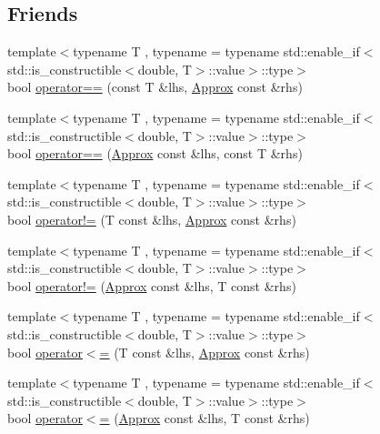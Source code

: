 \subsection*{Friends}
\begin{DoxyCompactItemize}
\item 
{\footnotesize template$<$typename T , typename  = typename std\-::enable\-\_\-if$<$std\-::is\-\_\-constructible$<$double, T$>$\-::value$>$\-::type$>$ }\\bool \hyperlink{class_catch_1_1_detail_1_1_approx_ab38782a37d09b527ca5e126dbf433dda}{operator==} (const T \&lhs, \hyperlink{class_catch_1_1_detail_1_1_approx}{Approx} const \&rhs)
\item 
{\footnotesize template$<$typename T , typename  = typename std\-::enable\-\_\-if$<$std\-::is\-\_\-constructible$<$double, T$>$\-::value$>$\-::type$>$ }\\bool \hyperlink{class_catch_1_1_detail_1_1_approx_a0e5ef1957d4c38d7857005909c613743}{operator==} (\hyperlink{class_catch_1_1_detail_1_1_approx}{Approx} const \&lhs, const T \&rhs)
\item 
{\footnotesize template$<$typename T , typename  = typename std\-::enable\-\_\-if$<$std\-::is\-\_\-constructible$<$double, T$>$\-::value$>$\-::type$>$ }\\bool \hyperlink{class_catch_1_1_detail_1_1_approx_a29696f14ebd51887c8c88e771d12ef54}{operator!=} (T const \&lhs, \hyperlink{class_catch_1_1_detail_1_1_approx}{Approx} const \&rhs)
\item 
{\footnotesize template$<$typename T , typename  = typename std\-::enable\-\_\-if$<$std\-::is\-\_\-constructible$<$double, T$>$\-::value$>$\-::type$>$ }\\bool \hyperlink{class_catch_1_1_detail_1_1_approx_a31d62e3c35abb86cf25e02601966ca5d}{operator!=} (\hyperlink{class_catch_1_1_detail_1_1_approx}{Approx} const \&lhs, T const \&rhs)
\item 
{\footnotesize template$<$typename T , typename  = typename std\-::enable\-\_\-if$<$std\-::is\-\_\-constructible$<$double, T$>$\-::value$>$\-::type$>$ }\\bool \hyperlink{class_catch_1_1_detail_1_1_approx_a0369de03e81bc2ceaf6c9d830476bd49}{operator$<$=} (T const \&lhs, \hyperlink{class_catch_1_1_detail_1_1_approx}{Approx} const \&rhs)
\item 
{\footnotesize template$<$typename T , typename  = typename std\-::enable\-\_\-if$<$std\-::is\-\_\-constructible$<$double, T$>$\-::value$>$\-::type$>$ }\\bool \hyperlink{class_catch_1_1_detail_1_1_approx_a6040b908588745570847d7ae8483b091}{operator$<$=} (\hyperlink{class_catch_1_1_detail_1_1_approx}{Approx} const \&lhs, T const \&rhs)

\end{DoxyCompactItemize}
